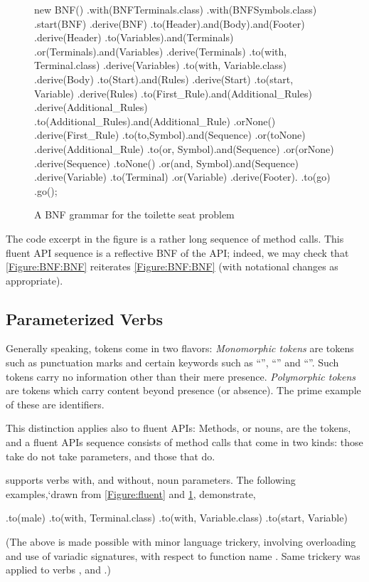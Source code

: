 \begin{figure}[H]
  \begin{JAVA}[style=numbered]
new BNF()
  .with(BNFTerminals.class)
  .with(BNFSymbols.class)
  .start(BNF)
  .derive(BNF)
    .to(Header).and(Body).and(Footer)
  .derive(Header)
    .to(Variables).and(Terminals)
    .or(Terminals).and(Variables)
  .derive(Terminals)
    .to(with, Terminal.class)
  .derive(Variables)
    .to(with, Variable.class)
  .derive(Body)
    .to(Start).and(Rules)
  .derive(Start)
    .to(start, Variable)
  .derive(Rules)
    .to(First_Rule).and(Additional_Rules)
  .derive(Additional_Rules)
    .to(Additional_Rules).and(Additional_Rule)
    .orNone()
  .derive(First_Rule)
    .to(to,Symbol).and(Sequence)
    .or(toNone)
  .derive(Additional_Rule)
    .to(or, Symbol).and(Sequence)
    .or(orNone)
  .derive(Sequence)
    .toNone()
    .or(and, Symbol).and(Sequence)
  .derive(Variable)
    .to(Terminal)
    .or(Variable)
  .derive(Footer).
     .to(go)
.go();\end{JAVA}
  \caption{A BNF grammar for the toilette seat problem}
  \label{Figure:BNF:fluent}
\end{figure}

The code excerpt in the figure is a rather long
  sequence of method calls.
This fluent API sequence is a reflective BNF 
  of the \SELF API;
  indeed, we may check that \cref{Figure:BNF:BNF} reiterates \cref{Figure:BNF:BNF}
  (with notational changes as appropriate). 

\subsection{Parameterized Verbs}
Generally speaking, tokens come in two flavors: 
  \emph{Monomorphic tokens} are tokens such as punctuation marks and certain keywords  
    such as ``'', ``'' and ``''. 
Such tokens carry no information other than their mere presence.
\emph{Polymorphic tokens} are tokens which carry content beyond presence (or absence). 
The prime example of these are identifiers. 

This distinction applies also to fluent APIs:
Methods, or nouns, are the tokens, and a fluent APIs sequence consists of 
  method calls that come in two kinds: those take do not take parameters, and those that do.

\SELF supports verbs with, and without, noun parameters. 
The following examples,`drawn from \cref{Figure:fluent} and \cref{Figure:BNF:fluent},
  demonstrate, 
\begin{JAVA}
    .to(male)
    .to(with, Terminal.class)
    .to(with, Variable.class)
    .to(start, Variable)\end{JAVA}
(The above is made possible with minor \Java language trickery,
  involving overloading and use of variadic signatures,
  with respect to function name .
Same trickery was applied to verbs , and .)



  
